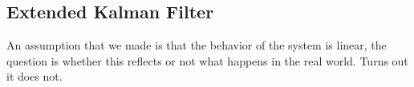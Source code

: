\subsection{Extended Kalman Filter}

An assumption that we made is that the behavior of the system is linear, the question is whether this reflects or not what happens in the real world. Turns out it does not.